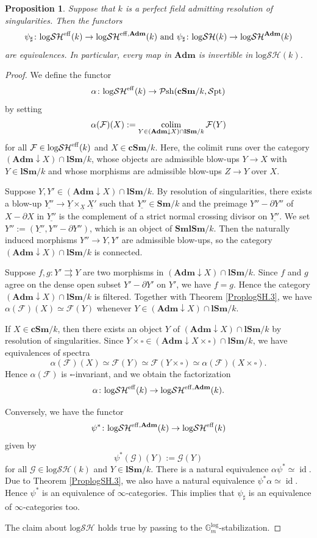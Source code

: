 \documentclass[11pt, a4paper]{amsart}
\newtheorem{prop}[thm]{Proposition}
\theoremstyle{definition}
\numberwithin{equation}{subsection}
\newcommand{\Sm}{\mathbf{Sm}}
\newcommand{\lSm}{\mathbf{lSm}}
\newcommand{\cSm}{\mathbf{cSm}}
\newcommand{\SmlSm}{\mathbf{SmlSm}}
\newcommand{\id}{\operatorname{id}}   			%
\newcommand{\colimit}{\mathop{\rm colim}}
\newcommand{\Adm}{\mathbf{Adm}}
\renewcommand{\ul}{\underline}
\newcommand{\cF}{\mathcal{F}}
\newcommand{\cG}{\mathcal{G}}
\newcommand{\boxx}{\square}
\newcommand{\Gmm}{\mathbb{G}_m^{\mathrm{log}}}
\newcommand{\eff}{{\rm eff}}
\newcommand{\infPsh}{\mathcal{P}\mathrm{sh}}
\newcommand{\infSpt}{\mathcal{S}\mathrm{pt}}
\newcommand{\inflogSH}{\mathrm{log}\mathcal{SH}}
\newcommand{\inflogSHS}{\mathrm{log}\mathcal{SH}^{\mathrm{eff}}}
\begin{document}
\begin{prop}
\label{ProplogSH.8}
Suppose that $k$ is a perfect field admitting resolution of singularities.
Then the functors
\[
\psi_\sharp
\colon
\inflogSHS(k)
\to
{\inflogSH}^{\eff,\Adm}(k)
\text{ and }
\psi_\sharp
\colon
\inflogSH(k)
\to
\inflogSH^\Adm(k)
\]
are equivalences. In particular, every map in $\Adm$ is invertible in $\inflogSH(k)$.
\end{prop}
\begin{proof}
We define the functor
\[
\alpha
\colon
\inflogSH^{\eff}(k)
\to
\infPsh(\cSm/k,\infSpt)
\]
by setting
\[
\alpha(\cF)(X)
:=
\colimit_{Y\in (\Adm\downarrow X)\cap \lSm/k} \cF(Y)
\]
for all $\cF\in \inflogSH^{\eff}(k)$ and $X\in \cSm/k$.
Here, 
the colimit runs over the category $(\Adm\downarrow X)\cap \lSm/k$, 
whose objects are admissible blow-ups $Y\to X$ with $Y\in \lSm/k$ and whose morphisms are 
admissible blow-ups $Z\to Y$ over $X$.

Suppose $Y,Y'\in (\Adm\downarrow X)\cap \lSm/k$.
By resolution of singularities,
there exists a blow-up $\ul{Y''}\to \ul{Y}\times_{\ul{X}} \ul{X'}$ such that $\ul{Y''}\in \Sm/k$ and the preimage $Y''-\partial Y''$ of $X-\partial X$ in $\ul{Y''}$ is the complement of a strict normal crossing divisor on $\ul{Y''}$.
We set $Y'':=(\ul{Y''},Y''-\partial Y'')$,
which is an object of $\SmlSm/k$.
Then the naturally induced morphisms $Y''\to Y,Y'$ are admissible blow-ups,
so the category $(\Adm\downarrow X)\cap \lSm/k$ is connected.

Suppose $f,g\colon Y'\rightrightarrows Y$ are two morphisms in $(\Adm\downarrow X)\cap \lSm/k$.
Since $f$ and $g$ agree on the dense open subset $Y'-\partial Y'$ on $Y'$,
we have $f=g$.
Hence the category $(\Adm\downarrow X)\cap \lSm/k$ is filtered.
Together with Theorem \ref{ProplogSH.3},
we have $\alpha(\cF)(X)\simeq \cF(Y)$ whenever $Y\in (\Adm\downarrow X)\cap \lSm/k$.

If $X\in \cSm/k$,
then there exists an object $Y$ of $(\Adm\downarrow X)\cap \lSm/k$ by resolution of singularities.
Since $Y\times \boxx\in (\Adm\downarrow X\times \boxx)\cap \lSm/k$,
we have equivalences of spectra
\[
\alpha(\cF)(X)
\simeq
\cF(Y)
\simeq
\cF(Y\times \boxx)
\simeq
\alpha(\cF)(X\times \boxx).
\]
Hence $\alpha(\cF)$ is $\boxx$-invariant,
and we obtain the factorization  
\[
\alpha
\colon
\inflogSH^{\eff}(k)
\to
\inflogSH^{\eff,\Adm}(k).
\]


Conversely,
we have the functor
\[
\psi^*
\colon
\inflogSH^{\eff,\Adm}(k)
\to
\inflogSH^{\eff}(k)
\]
given by
\[
\psi^*(\cG)(Y)
:=
\cG(Y)
\]
for all $\cG\in \inflogSH(k)$ and $Y\in \lSm/k$.
There is a natural equivalence $\alpha\psi^*\simeq \id$.
Due to Theorem \ref{ProplogSH.3},
we also have a natural equivalence $\psi^*\alpha\simeq\id$.
Hence $\psi^*$ is an equivalence of $\infty$-categories.
This implies that $\psi_\sharp$ is an equivalence of $\infty$-categories too.

The claim about $\inflogSH$ holds true by passing to the $\Gmm$-stabilization.
\end{proof}
\end{document}
